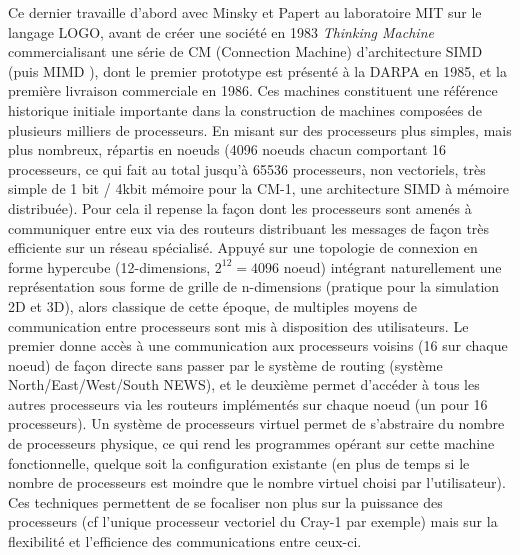 Ce dernier travaille d'abord avec Minsky et Papert au laboratoire MIT sur le langage LOGO, avant de créer une société en 1983 \textit{Thinking Machine} commercialisant une série de CM (Connection Machine) d’architecture SIMD (puis MIMD ), dont le premier prototype est présenté à la DARPA en 1985, et la première livraison commerciale en 1986. Ces machines constituent une référence historique initiale importante dans la construction de machines composées de plusieurs milliers de processeurs. En misant sur des processeurs plus simples, mais plus nombreux, répartis en noeuds (4096 noeuds chacun comportant 16 processeurs, ce qui fait au total jusqu'à 65536 processeurs, non vectoriels, très simple de 1 bit / 4kbit mémoire pour la CM-1, une architecture SIMD à mémoire distribuée). Pour cela il repense la façon dont les processeurs sont amenés à communiquer entre eux via des routeurs distribuant les messages de façon très efficiente sur un réseau spécialisé. Appuyé sur une topologie de connexion en forme hypercube (12-dimensions, $2^{12} = 4096$ noeud) intégrant naturellement une représentation sous forme de grille de n-dimensions (pratique pour la simulation 2D et 3D), alors classique de cette époque, de multiples moyens de communication entre processeurs sont mis à disposition des utilisateurs. Le premier donne accès à une communication aux processeurs voisins (16 sur chaque noeud) de façon directe sans passer par le système de routing (système North/East/West/South NEWS), et le deuxième permet d'accéder à tous les autres processeurs via les routeurs implémentés sur chaque noeud (un pour 16 processeurs). Un système de processeurs virtuel permet de s'abstraire du nombre de processeurs physique, ce qui rend les programmes opérant sur cette machine fonctionnelle, quelque soit la configuration existante (en plus de temps si le nombre de processeurs est moindre que le nombre virtuel choisi par l'utilisateur). Ces techniques permettent de se focaliser non plus sur la puissance des processeurs (cf l'unique processeur vectoriel du Cray-1 par exemple) mais sur la flexibilité et l'efficience des communications entre ceux-ci.

